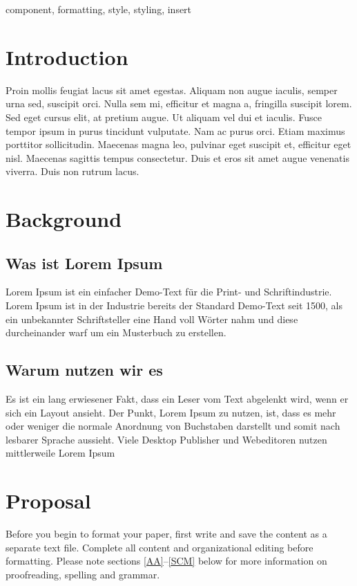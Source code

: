 \documentclass[conference]{IEEEtran}
\begin{document}
\begin{IEEEkeywords}
	component, formatting, style, styling, insert
\end{IEEEkeywords}

\section{Introduction}
	Proin mollis feugiat lacus sit amet egestas. Aliquam non augue iaculis, semper urna sed, suscipit orci. Nulla sem mi, efficitur et magna a, fringilla suscipit lorem. Sed eget cursus elit, at pretium augue. Ut aliquam vel dui et iaculis. Fusce tempor ipsum in purus tincidunt vulputate. Nam ac purus orci. Etiam maximus porttitor sollicitudin. Maecenas magna leo, pulvinar eget suscipit et, efficitur eget nisl. Maecenas sagittis tempus consectetur. Duis et eros sit amet augue venenatis viverra. Duis non rutrum lacus.

\section{Background}
	\subsection{Was ist Lorem Ipsum}
		Lorem Ipsum ist ein einfacher Demo-Text für die Print- und Schriftindustrie. Lorem Ipsum ist in der Industrie bereits der Standard Demo-Text seit 1500, als ein unbekannter Schriftsteller eine Hand voll Wörter nahm und diese durcheinander warf um ein Musterbuch zu erstellen.

	\subsection{Warum nutzen wir es}
		Es ist ein lang erwiesener Fakt, dass ein Leser vom Text abgelenkt wird, wenn er sich ein Layout ansieht. Der Punkt, Lorem Ipsum zu nutzen, ist, dass es mehr oder weniger die normale Anordnung von Buchstaben darstellt und somit nach lesbarer Sprache aussieht. Viele Desktop Publisher und Webeditoren nutzen mittlerweile Lorem Ipsum

\section{Proposal}
	Before you begin to format your paper, first write and save the content as a 
	separate text file. Complete all content and organizational editing before 
	formatting. Please note sections \ref{AA}--\ref{SCM} below for more information on 
	proofreading, spelling and grammar.
\end{document}
